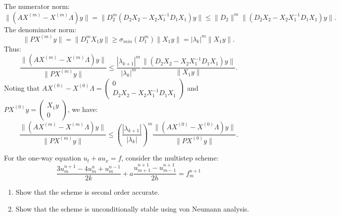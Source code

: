 \begin{solution}
\begin{enumerate}
\[    \]
    The numerator norm:
    \[
    \| (AX^{(m)} - X^{(m)} \Lambda) y \| = \| D_2^m (D_2 X_2 - X_2 X_1^{-1} D_1 X_1) y \| \leq \| D_2 \|^m \| (D_2 X_2 - X_2 X_1^{-1} D_1 X_1) y \|.
    \]
    The denominator norm:
    \[
    \| PX^{(m)} y \| = \| D_1^m X_1 y \| \geq \sigma_{min}(D_1^m) \| X_1 y \| = |\lambda_k|^m \| X_1 y \|.
    \]
    Thus:
    \[
    \frac{\| (AX^{(m)} - X^{(m)} \Lambda) y \|}{\| PX^{(m)} y \|} \leq \frac{|\lambda_{k+1}|^m}{|\lambda_k|^m} \frac{\| (D_2 X_2 - X_2 X_1^{-1} D_1 X_1) y \|}{\| X_1 y \|}.
    \]
    Noting that $AX^{(0)} - X^{(0)} \Lambda = \begin{pmatrix} 0 \\ D_2 X_2 - X_2 X_1^{-1} D_1 X_1 \end{pmatrix}$ and $PX^{(0)} y = \begin{pmatrix} X_1 y \\ 0 \end{pmatrix}$, we have:
    \[
    \frac{\| (AX^{(m)} - X^{(m)} \Lambda) y \|}{\| PX^{(m)} y \|} \leq \left(\frac{|\lambda_{k+1}|}{|\lambda_k|}\right)^m \frac{\| (AX^{(0)} - X^{(0)} \Lambda) y \|}{\| PX^{(0)} y \|}.
    \]
\end{enumerate}
\end{solution}

\begin{exercise}
\label{applied:2018:9}
For the one-way equation $u_t + a u_x = f$, consider the multistep scheme:
\[
\frac{3u_m^{n+1} - 4u_m^n + u_m^{n-1}}{2k} + a \frac{u_{m+1}^{n+1} - u_{m-1}^{n+1}}{2h} = f_m^{n+1}
\]
\begin{enumerate}
    \item Show that the scheme is second order accurate.
    \item Show that the scheme is unconditionally stable using von Neumann analysis.
\end{enumerate}
\end{exercise}

